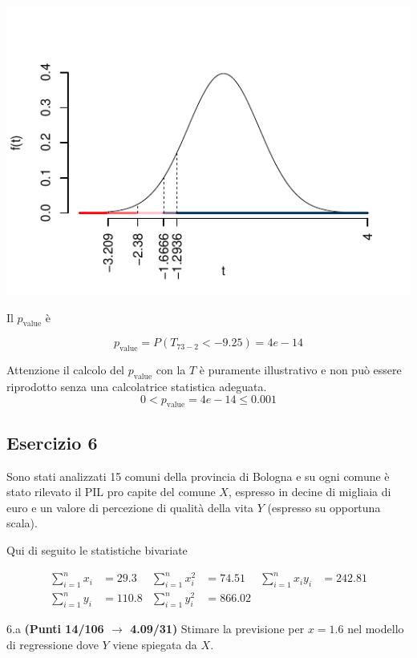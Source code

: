 \documentclass[
  11pt,
]{book}
\theoremstyle{mytheoremstyle}
\theoremstyle{mydefstyle}
\newenvironment{sol}
  {
  \begin{tcolorbox}[enhanced,breakable,arc=0.1mm,boxrule=1pt,colback=white,colframe=iblue,
  title=\bf \fontfamily{lmss}\selectfont \hspace{.5 cm} Soluzione,drop fuzzy shadow]

}{
\end{tcolorbox}
  }
\begin{document}
\begin{sol}
\begin{center}\includegraphics{Esami_passati_con_soluzioni_files/figure-latex/2022-99-1} \end{center}

Il \(p_{\text{value}}\) è

\[ p_{\text{value}} = P(T_{73-2}<-9.25)=4e-14 \]

Attenzione il calcolo del \(p_\text{value}\) con la \(T\) è puramente illustrativo e non può essere riprodotto senza una calcolatrice statistica adeguata.\[
 0 < p_\text{value}= 4e-14 \leq 0.001 
\]

\end{sol}

\subsection{Esercizio 6}\label{esercizio-6-15}

Sono stati analizzati 15 comuni della provincia di Bologna e su ogni comune è stato rilevato
il PIL pro capite del comune \(X\), espresso in decine di migliaia di euro e un valore di percezione di
qualità della vita \(Y\) (espresso su opportuna scala).

Qui di seguito le statistiche bivariate

\begin{align*}
  \sum_{i=1}^n x_i &= 29.3 &\sum_{i=1}^n x_i^2 &= 74.51 &\sum_{i=1}^n x_i y_i &= 242.81\\
  \sum_{i=1}^n y_i &= 110.8 & \sum_{i=1}^n y_i^2 &= 866.02 &
\end{align*}

6.a \textbf{(Punti 14/106 \(\rightarrow\) 4.09/31)} Stimare la previsione per \(x=1.6\) nel modello di regressione dove \(Y\) viene spiegata da \(X\).
\end{document}

